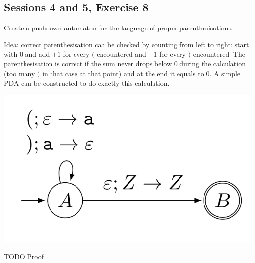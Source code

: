 \subsection{Sessions 4 and 5, Exercise 8}


Create a pushdown automaton for the language of proper parenthesisations.


Idea: correct parenthesisation can be checked by counting from left to right: start with $0$ and add $+1$ for every $($ encountered and $-1$ for every $)$ encountered. The parenthesisation is correct if the sum never drops below $0$ during the calculation (too many $)$ in that case at that point) and at the end it equals to $0$. A simple PDA can be constructed to do exactly this calculation.


\includegraphics[width=0.4\linewidth]{04/4_8.png}

TODO Proof